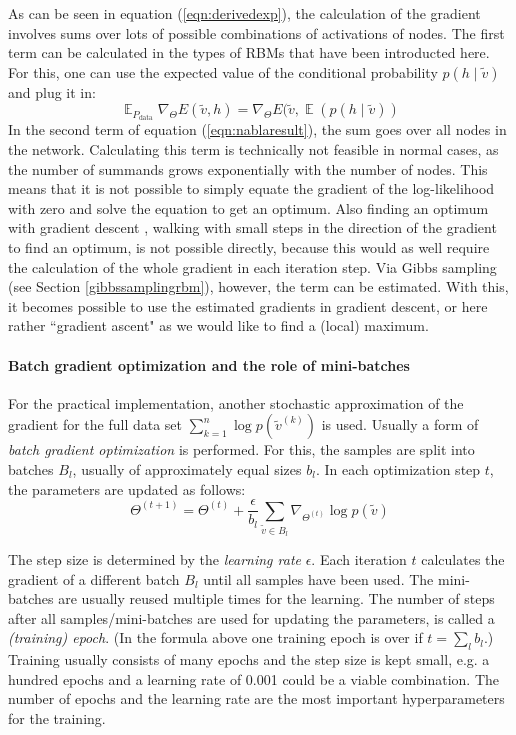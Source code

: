 \documentclass[12pt]{article}
\DeclareMathOperator{\EX}{\mathbb{E}}
\begin{document}
As can be seen in equation (\ref{eqn:derivedexp}), the calculation of the gradient involves sums over lots of possible combinations of activations of nodes.
The first term can be calculated in the types of RBMs that have been introducted here.
For this, one can use the expected value of the conditional probability $p(h\mid\widetilde{v})$ and plug it in:
\begin{equation}
\EX_{P_\text{data}} \nabla_{\!\Theta} E(\widetilde{v},h) =  \nabla_{\!\Theta} E(\widetilde{v}, \EX(p(h \mid \widetilde{v}))
\label{eqn:plugexpectedh}
\end{equation}
In the second term of equation (\ref{eqn:nablaresult}), the sum goes over all nodes in the network.
Calculating this term is technically not feasible in normal cases, as the number of summands grows exponentially with the number of nodes.
This means that it is not possible to simply equate the gradient of the log-likelihood with zero and solve the equation to get an optimum. Also finding an optimum with gradient descent \citep{gradientdescent}, walking with small steps in the direction of the gradient to find an optimum, is not possible directly, because this would as well require the calculation of the whole gradient in each iteration step.
Via Gibbs sampling (see Section \ref{gibbssamplingrbm}), however, the term can be estimated.
With this, it becomes possible to use the estimated gradients in gradient descent, or here rather ``gradient ascent" as we would like to find a (local) maximum.

\paragraph{Batch gradient optimization and the role of mini-batches}

For the practical implementation, another stochastic approximation of the gradient for the full data set $\sum_{k=1}^n \log p(\widetilde{v}^{(k)})$ is used.
Usually a form of {\em batch gradient optimization} \citep{bottou_optimization_2018} is performed.
For this, the samples are split into batches $B_l$, usually of approximately equal sizes $b_l$.
In each optimization step $t$, the parameters are updated as follows:
\[
\Theta^{(t+1)} = \Theta^{(t)} + \frac{\epsilon}{b_l} \sum_{\widetilde{v} \in B_l} \nabla_{\!\Theta^{(t)}} \log p(\widetilde{v})
\]

The step size is determined by the {\em learning rate} $\epsilon$.
Each iteration $t$ calculates the gradient of a different batch $B_l$ until all samples have been used.
The mini-batches are usually reused multiple times for the learning.
The number of steps after all samples/mini-batches are used for updating the parameters, is called a {\em (training) epoch}.
(In the formula above one training epoch is over if $t = \sum_l b_l$.)
Training usually consists of many epochs and the step size is kept small, e.g. a hundred epochs and a learning rate of 0.001 could be a viable combination.
The number of epochs and the learning rate are the most important hyperparameters for the training.
\end{document}

